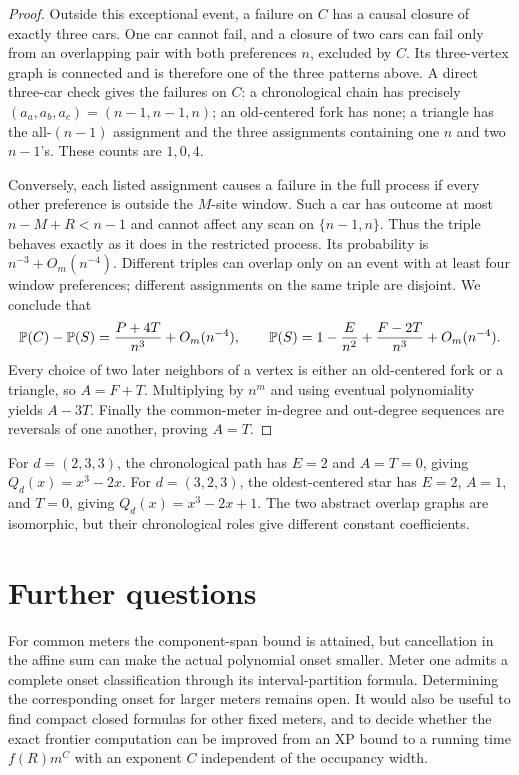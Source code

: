 \documentclass[11pt,a4paper]{article}
\begin{document}
\begin{proof}
Outside this exceptional event, a failure on $C$ has a causal closure
of exactly three cars. One car cannot fail, and a closure of two
cars can fail only from an overlapping pair with both preferences
$n$, excluded by $C$. Its three-vertex graph is connected and is
therefore one of the three patterns above. A direct three-car check
gives the failures on $C$: a chronological chain has precisely
$(a_a,a_b,a_c)=(n-1,n-1,n)$; an old-centered fork has none; a triangle
has the all-$(n-1)$ assignment and the three assignments containing
one $n$ and two $n-1$'s. These counts are $1,0,4$.

Conversely, each listed assignment causes a failure in the full
process if every other preference is outside the $M$-site window.
Such a car has outcome at most $n-M+R<n-1$ and cannot affect any
scan on $\{n-1,n\}$. Thus the triple behaves exactly as it does in
the restricted process. Its probability is $n^{-3}+O_m(n^{-4})$.
Different triples can overlap only on an event with at least four
window preferences; different assignments on the same triple are
disjoint. We conclude that
\[
 \mathbb P(C)-\mathbb P(S)=\frac{P+4T}{n^3}+O_m(n^{-4}),
 \qquad
 \mathbb P(S)=1-\frac E{n^2}+\frac{F-2T}{n^3}+O_m(n^{-4}).
\]
Every choice of two later neighbors of a vertex is either an
old-centered fork or a triangle, so $A=F+T$. Multiplying by $n^m$
and using eventual polynomiality yields $A-3T$. Finally the
common-meter in-degree and out-degree sequences are reversals of
one another, proving $A=T$.
\end{proof}


\begin{example}
For $d=(2,3,3)$, the chronological path has $E=2$ and $A=T=0$, giving $Q_d(x)=x^3-2x$. For $d=(3,2,3)$, the oldest-centered star has $E=2$, $A=1$, and $T=0$, giving $Q_d(x)=x^3-2x+1$. The two abstract overlap graphs are isomorphic, but their chronological roles give different constant coefficients.
\end{example}

\clearpage
\section{Further questions}
For common meters the component-span bound is attained, but cancellation in the affine sum can make the actual polynomial onset smaller. Meter one admits a complete onset classification through its interval-partition formula. Determining the corresponding onset for larger meters remains open. It would also be useful to find compact closed formulas for other fixed meters, and to decide whether the exact frontier computation can be improved from an XP bound to a running time $f(R)m^C$ with an exponent $C$ independent of the occupancy width.
\end{document}

